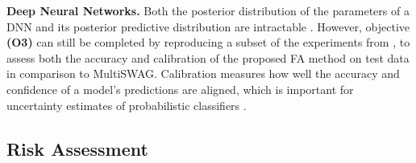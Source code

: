 \documentclass[a4paper,11pt]{article}
\begin{document}


\textbf{Deep Neural Networks. } Both the posterior distribution of the parameters of a DNN and its posterior predictive distribution are intractable \cite{kingma2013}. However, objective \textbf{(O3)} can still be completed by reproducing a subset of the experiments from \cite{izmailov2020}, to assess both the accuracy and calibration of the proposed FA method on test data in comparison to MultiSWAG. Calibration measures how well the accuracy and confidence of a model's predictions are aligned, which is important for uncertainty estimates of probabilistic classifiers \cite{maddox2019}.



\subsection{Risk Assessment}
\end{document}
